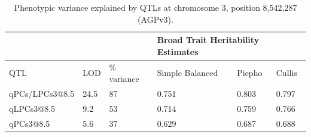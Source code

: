 \documentclass[9pt,twocolumn,twoside,lineno]{biorxiv}
\begin{document}
\clearpage


\begin{table}[h!]
\begin{tabular}{@{}llllll@{}}
\toprule
               &      &             & \multicolumn{3}{l}{Broad Trait Heritability Estimates} \\ \midrule
QTL            & LOD  & \% variance & Simple Balanced        & Piepho        & Cullis        \\
qPCs/LPCs3@8.5 & 24.5 & 87          & 0.751                  & 0.803         & 0.797           \\
qLPCs3@8.5     & 9.2  & 53          & 0.714                  & 0.759         & 0.766         \\
qPCs3@8.5      & 5.6  & 37          & 0.629                  & 0.687         & 0.688         \\ \bottomrule
\end{tabular}
\label{tab:table2}
\caption{ Phenotypic variance explained by QTLs at chromosome 3, position 8,542,287 (AGPv3).}
\end{table}

\clearpage

\renewcommand{\thefigure}{Supplementary Figure \arabic{figure}}
\renewcommand{\thetable}{S\arabic{table}}%

\setcounter{figure}{0}
\setcounter{table}{0}
\end{document}
